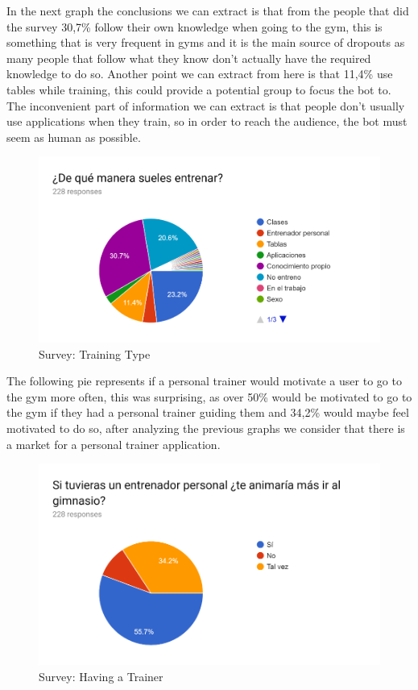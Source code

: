 In the next graph the conclusions we can extract is that from the people that did the survey 30,7\% follow their own knowledge when going to the gym, this is something that is very frequent in gyms and it is the main source of dropouts as many people that follow what they know don’t actually have the required knowledge to do so. Another point we can extract from here is that 11,4\% use tables while training, this could provide a potential group to focus the bot to. The inconvenient part of information we can extract is that people don’t usually use applications when they train, so in order to reach the audience, the bot must seem as human as possible.

\begin{center}
	\begin{figure}[h!]
		\centering
		\includegraphics[scale=1]{./images/4-train-type}
		\caption{Survey: Training Type}
		\label{4_train_type}
	\end{figure}
\end{center}

The following pie represents if a personal trainer would motivate a user to go to the gym more often, this was surprising, as over 50\% would be motivated to go to the gym if they had a personal trainer guiding them and 34,2\% would maybe feel motivated to do so, after analyzing the previous graphs we consider that there is a market for a personal trainer application.

\begin{center}
	\begin{figure}[h!]
		\centering
		\includegraphics[scale=1]{./images/4-if-trainer}
		\caption{Survey: Having a Trainer}
		\label{4_if_trainer}
	\end{figure}
\end{center}


